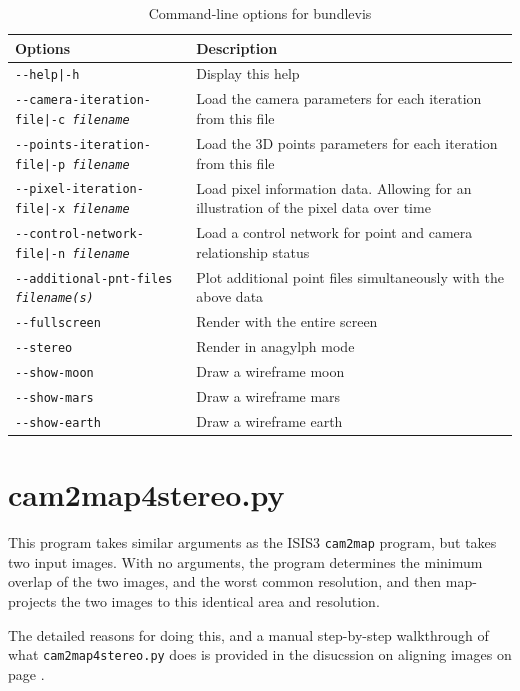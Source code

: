 \begin{longtable}{|l|p{10cm}|}
\caption{Command-line options for bundlevis}
\label{tbl:bundlevis}
\endfirsthead
\endhead
\endfoot
\endlastfoot
\hline
Options & Description \\ \hline \hline
\texttt{-\/-help|-h} & Display this help \\ \hline
\texttt{-\/-camera-iteration-file|-c \textit{filename}} & Load the camera parameters for each iteration from this file \\ \hline
\texttt{-\/-points-iteration-file|-p \textit{filename}} & Load the 3D points parameters for each iteration from this file \\ \hline
\texttt{-\/-pixel-iteration-file|-x \textit{filename}} & Load pixel information data. Allowing for an illustration of the pixel data over time \\ \hline
\texttt{-\/-control-network-file|-n \textit{filename}} & Load a control network for point and camera relationship status \\ \hline
\texttt{-\/-additional-pnt-files \textit{filename(s)}} & Plot additional point files simultaneously with the above data \\ \hline
\texttt{-\/-fullscreen} & Render with the entire screen \\ \hline
\texttt{-\/-stereo} & Render in anagylph mode \\ \hline
\texttt{-\/-show-moon} & Draw a wireframe moon \\ \hline
\texttt{-\/-show-mars} & Draw a wireframe mars \\ \hline
\texttt{-\/-show-earth} & Draw a wireframe earth \\ \hline
\end{longtable}

\section{cam2map4stereo.py}
\label{cam2map4stereo}

This program takes similar arguments as the ISIS3 \texttt{cam2map} program,
but takes two input images.  With no arguments, the program determines
the minimum overlap of the two images, and the worst common resolution,
and then map-projects the two images to this identical area and resolution.

The detailed reasons for doing this, and a manual step-by-step walkthrough of
what \texttt{cam2map4stereo.py} does is provided in the disucssion on aligning images on page \pageref{sec:AligningImages}.

